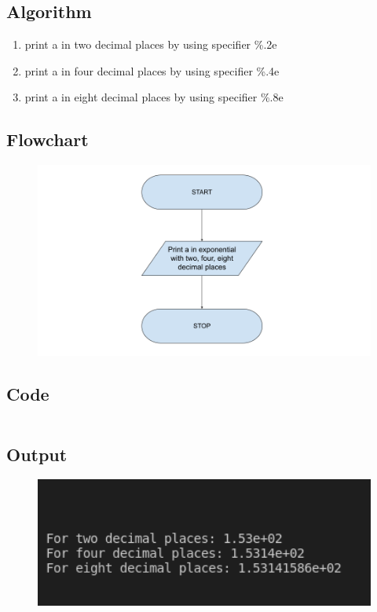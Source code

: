 \documentclass[12pt]{article}
\begin{document}
\section{}
\subsection{Algorithm}
\begin{enumerate}
    \item print a in two decimal places by using specifier \%.2e
    \item print a in four decimal places by using specifier \%.4e
    \item print a in eight decimal places by using specifier \%.8e
\end{enumerate}
\subsection{Flowchart}
\begin{figure}[h]
    \centering
    \includegraphics[width=1.0\textwidth]{Flowchart09.png}
\end{figure}
\newpage
\subsection{Code}
\inputminted{c}{q9.c}
\subsection{Output}
\begin{figure}[h]
    \centering
    \includegraphics[width=1.0\textwidth]{9.png}
\end{figure}
\newpage
\end{document}
